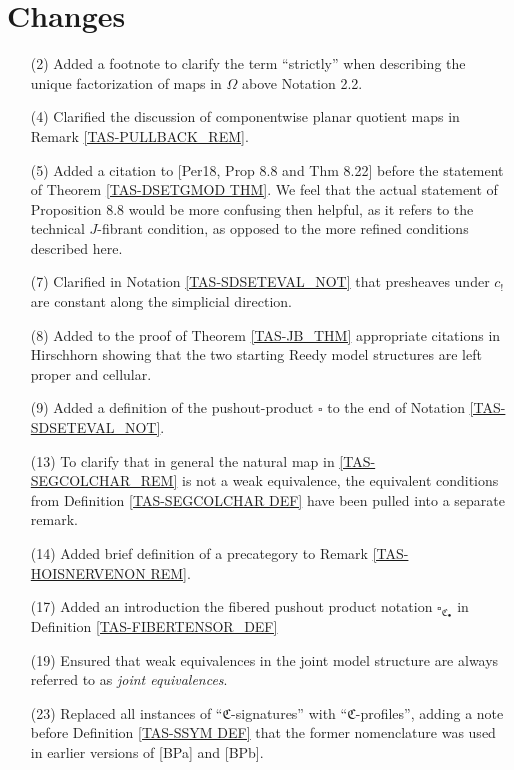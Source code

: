 \documentclass[a4paper,10pt
]{article}%
\numberwithin{equation}{section}
\numberwithin{figure}{section}
\theoremstyle{definition} %
\newcommand{\1}{\ensuremath{\mathbbm 1}}%
\begin{document}
\section{Changes}

\begin{enumerate}
\item[(2)] Added a footnote to clarify the term ``strictly'' when describing the unique factorization of maps in $\Omega$ above Notation 2.2.
\item[(4)] Clarified the discussion of componentwise planar quotient maps in Remark \ref{TAS-PULLBACK_REM}.
\item[(5)] Added a citation to [Per18, Prop 8.8 and Thm 8.22] before the statement of Theorem \ref{TAS-DSETGMOD THM}.
        We feel that the actual statement of Proposition 8.8 would be more confusing then helpful, as it refers to the technical $J$-fibrant condition, as opposed to the more refined conditions described here.
\item[(7)] Clarified in Notation \ref{TAS-SDSETEVAL_NOT} that presheaves under $c_!$ are constant along the simplicial direction.
\item[(8)] Added to the proof of Theorem \ref{TAS-JB_THM} appropriate citations in Hirschhorn showing that the two starting Reedy model structures are left proper and cellular.
\item[(9)] Added a definition of the pushout-product $\square$ to the end of Notation \ref{TAS-SDSETEVAL_NOT}.
\item[(13)] To clarify that in general the natural map in \ref{TAS-SEGCOLCHAR_REM} is not a weak equivalence, the equivalent conditions from Definition \ref{TAS-SEGCOLCHAR DEF} have been pulled into a separate remark.
\item[(14)] Added brief definition of a precategory to Remark \ref{TAS-HOISNERVENON REM}.
\item[(17)] Added an introduction the fibered pushout product notation $\square_{\mathfrak C_\bullet}$ in Definition \ref{TAS-FIBERTENSOR_DEF}
\item[(19)] Ensured that weak equivalences in the joint model structure are always referred to as \textit{joint equivalences}.
\item[(23)] Replaced all instances of ``$\mathfrak C$-signatures'' with ``$\mathfrak C$-profiles'', adding a note before Definition \ref{TAS-SSYM DEF} that the former nomenclature was used in earlier versions of [BPa] and [BPb].

\end{enumerate}
\end{document}

